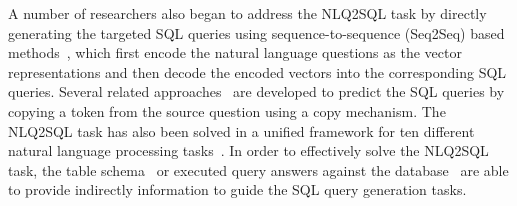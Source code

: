 A number of researchers also began to address the NLQ2SQL task by directly generating the targeted SQL queries using sequence-to-sequence (Seq2Seq) based methods~\cite{dong2016language,sutskever2014sequence,wang2018pointing}, which first encode the natural language questions as the vector representations and then decode the encoded vectors into the corresponding SQL queries.
 Several related approaches~\cite{wang2018pointing} are developed to predict the SQL queries by copying a token from the source question using a copy mechanism. 
The NLQ2SQL task has also been solved in a unified framework for ten different natural language processing tasks~\cite{mccann2018natural}. In order to effectively solve the NLQ2SQL task, the table schema~\cite{wang2018pointing,lukovnikov2018translating} or executed query answers against the database~\cite{pasupat2015compositional,yih2015semantic,yin2015neural} are able to provide indirectly information to guide the SQL query generation tasks. 




